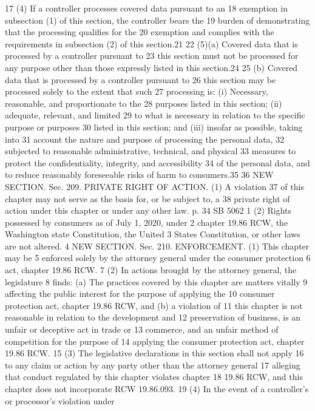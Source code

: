 17 (4) If a controller processes covered data pursuant to an
18 exemption in subsection (1) of this section, the controller bears the
19 burden of demonstrating that the processing qualifies for the
20 exemption and complies with the requirements in subsection (2) of
this section.21
22 (5)(a) Covered data that is processed by a controller pursuant to
23 this section must not be processed for any purpose other than those
expressly listed in this section.24
25 (b) Covered data that is processed by a controller pursuant to
26 this section may be processed solely to the extent that such
27 processing is: (i) Necessary, reasonable, and proportionate to the
28 purposes listed in this section; (ii) adequate, relevant, and limited
29 to what is necessary in relation to the specific purpose or purposes
30 listed in this section; and (iii) insofar as possible, taking into
31 account the nature and purpose of processing the personal data,
32 subjected to reasonable administrative, technical, and physical
33 measures to protect the confidentiality, integrity, and accessibility
34 of the personal data, and to reduce reasonably foreseeable risks of
harm to consumers.35
36 NEW SECTION. Sec. 209. PRIVATE RIGHT OF ACTION. (1) A violation
37 of this chapter may not serve as the basis for, or be subject to, a
38 private right of action under this chapter or under any other law.
p. 34 SB 5062
1 (2) Rights possessed by consumers as of July 1, 2020, under
2 chapter 19.86 RCW, the Washington state Constitution, the United
3 States Constitution, or other laws are not altered.
4 NEW SECTION. Sec. 210. ENFORCEMENT. (1) This chapter may be
5 enforced solely by the attorney general under the consumer protection
6 act, chapter 19.86 RCW.
7 (2) In actions brought by the attorney general, the legislature
8 finds: (a) The practices covered by this chapter are matters vitally
9 affecting the public interest for the purpose of applying the
10 consumer protection act, chapter 19.86 RCW, and (b) a violation of
11 this chapter is not reasonable in relation to the development and
12 preservation of business, is an unfair or deceptive act in trade or
13 commerce, and an unfair method of competition for the purpose of
14 applying the consumer protection act, chapter 19.86 RCW.
15 (3) The legislative declarations in this section shall not apply
16 to any claim or action by any party other than the attorney general
17 alleging that conduct regulated by this chapter violates chapter
18 19.86 RCW, and this chapter does not incorporate RCW 19.86.093.
19 (4) In the event of a controller's or processor's violation under
